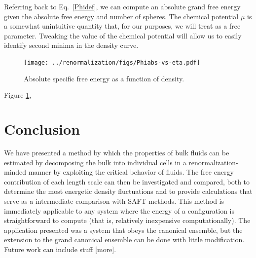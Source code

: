 \documentclass[12pt]{article}
\begin{document}
Referring back to Eq.~\ref{Phidef}, we can compute an absolute grand free energy given the absolute free energy and number of spheres. The chemical potential $\mu$ is a somewhat unintuitive quantity that, for our purposes, we will treat as a free parameter. Tweaking the value of the chemical potential will allow us to easily identify second minima in the density curve. 
\begin{figure}
\centering
    \texttt{[image: ../renormalization/figs/Phiabs-vs-eta.pdf]}
    \caption{Absolute specific free energy as a function of density.}
    \label{Phi-eta}
\end{figure}

Figure \ref{Phi-eta}, 


\section{Conclusion}
We have presented a method by which the properties of bulk fluids can be estimated by decomposing the bulk into individual cells in a renormalization-minded manner by exploiting the critical behavior of fluids. The free energy contribution of each length scale can then be investigated and compared, both to determine the most energetic density fluctuations and to provide calculations that serve as a intermediate comparison with SAFT methods. This method is immediately applicable to any system where the energy of a configuration is straightforward to compute (that is, relatively inexpensive computationally). The application presented was a system that obeys the canonical ensemble, but the extension to the grand canonical ensemble can be done with little modification. Future work can include stuff [more]. 
%
\cleardoublepage

\end{document}
